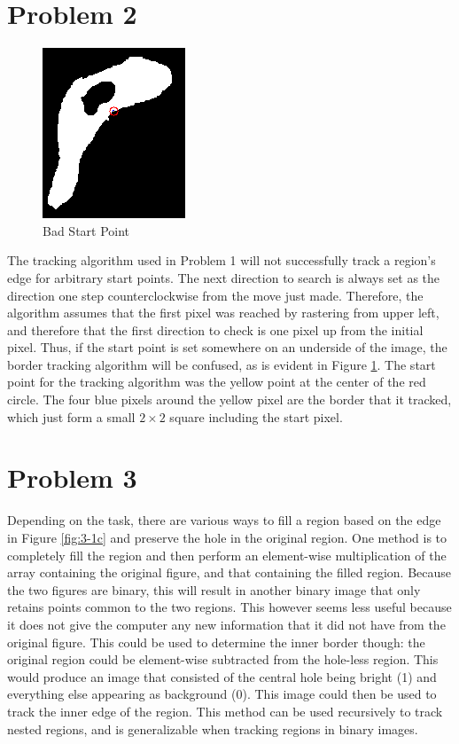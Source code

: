 \documentclass[aps,letterpaper,10pt]{article}
\begin{document}
\section{Problem 2}
\begin{figure}[!h]
\centering
\includegraphics[width=.5\textwidth]{3-2a.png}
\caption{Bad Start Point}
\label{fig:3-2}
\end{figure}
The tracking algorithm used in Problem 1 will not successfully track a region's edge for arbitrary start points.  The next direction to search is always set as the direction one step counterclockwise from the move just made.  Therefore, the algorithm assumes that the first pixel was reached by rastering from upper left, and therefore that the first direction to check is one pixel up from the initial pixel.  Thus, if the start point is set somewhere on an underside of the image, the border tracking algorithm will be confused, as is evident in Figure \ref{fig:3-2}.  The start point for the tracking algorithm was the yellow point at the center of the red circle.  The four blue pixels around the yellow pixel are the border that it tracked, which just form a small $2\times2$ square including the start pixel.
\newpage


\section{Problem 3}
Depending on the task, there are various ways to fill a region based on the edge in Figure \ref{fig:3-1c} and preserve the hole in the original region.  One method is to completely fill the region and then perform an element-wise multiplication of the array containing the original figure, and that containing the filled region.  Because the two figures are binary, this will result in another binary image that only retains points common to the two regions.  This however seems less useful because it does not give the computer any new information that it did not have from the original figure. This could be used to determine the inner border though: the original region could be element-wise subtracted from the hole-less region.  This would produce an  image that consisted of the central hole being bright (1) and everything else appearing as background (0).  This image could then be used to track the inner edge of the region.  This method can be used recursively to track nested regions, and is generalizable when tracking regions in binary images.
\end{document}
